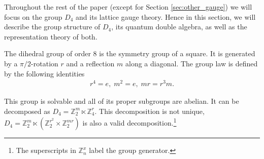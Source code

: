 \documentclass[a4paper,twocolumn,11pt, accepted=2024-06-14]{quantumarticle}
\begin{document}
Throughout the rest of the paper (except for Section \ref{sec:other_gauge}) we will focus on the group $D_4$ and its lattice gauge theory.
Hence in this section, we will describe the group structure of $D_4$, its quantum double algebra, as well as the representation theory of both.

The dihedral group of order 8 is the symmetry group of a square. It is generated by a $\pi/2$-rotation $r$ and a reflection  $m$ along a diagonal.
The group law is defined by the following identities
\begin{equation}
	\begin{split}
		r^4 = e,\;
		m^2 = e,	\;	mr = r^3m. \label{eqn:group}
	\end{split}
\end{equation}

This group is solvable and all of its proper subgroups are abelian. It can be decomposed as $D_4 = \mathbb{Z}^m_2 \ltimes \mathbb{Z}^r_4$.
This decomposition is not unique, $D_4 = \mathbb{Z}_2^m\ltimes(\mathbb{Z}_2^{r^2}\times\mathbb{Z}^{mr}_2)$ is also a valid decomposition.\footnote{The superscripts in $\mathbb{Z}_n^x$ label the group generator.}
\end{document}
